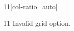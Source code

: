 \documentclass[paper=A4]{ropas-poster}
\begin{document}
\begin{postergrid}{1}{1}[col-ratio={auto}]
\begin{posterblock}{1}{1}
Invalid grid option.
\end{posterblock}
\end{postergrid}
\end{document}

